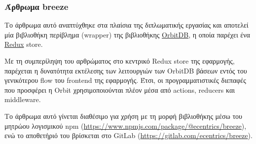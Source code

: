 \subsubsection{Άρθρωμα breeze} \label{subsubsection:4-3-1-eth-breeze-unit}

Το άρθρωμα αυτό αναπτύχθηκε στα πλαίσια της διπλωματικής εργασίας και αποτελεί μία βιβλιοθήκη περίβλημα (wrapper) της βιβλιοθήκης \hyperref[subsection:4-2-4-2-orbit-db]{OrbitDB}, η οποία παρέχει ένα \hyperref[subsection:4-2-2-1-redux]{Redux} store. 

Με τη συμπερίληψη του αρθρώματος στο κεντρικό Redux store της εφαρμογής, παρέχεται η δυνατότητα εκτέλεσης των λειτουργιών των OrbitDB βάσεων εντός του γενικότερου flow του frontend της εφαρμογής. Έτσι, οι προγραμματιστικές διεπαφές που προσφέρει η Orbit χρησιμοποιούνται πλέον μέσα από actions, reducers και middleware.

Το άρθρωμα αυτό γίνεται διαθέσιμο για χρήση με τη μορφή βιβλιοθήκης μέσω του μητρώου λογισμικού npm (\url{https://www.npmjs.com/package/@ecentrics/breeze}), ενώ το αποθετήριό του βρίσκεται στο GitLab (\url{https://gitlab.com/ecentrics/breeze}).
